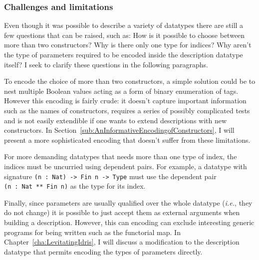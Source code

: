 \documentclass{ituthesis}
\newcommand{\tttype}[1]{\textcolor{type-color}{\texttt{#1}}}
\newcommand{\ttvar}[1]{\textcolor{local-var-color}{\texttt{#1}}}
\begin{document}
\subsubsection{Challenges and limitations}
Even though it was possible to describe a variety of datatypes there are still a few questions that can be raised, such as: How is it possible to choose between more than two constructors? Why is there only one type for indices?
Why aren't the type of parameters required to be encoded inside the description datatype itself? I seek to clarify these questions in the following paragraphs.

To encode the choice of more than two constructors, a simple solution could be to nest multiple Boolean values acting as a form of binary enumeration of tags.
However this encoding is fairly crude: it doesn't capture important information such as the names of constructors, requires a series of possibly complicated tests and is not easily extendible if one wants to extend descriptions
with new constructors. In Section~\ref{sub:AnInformativeEncodingofConstructors}, I will present a more sophisticated encoding that doesn't suffer from these limitations.

For more demanding datatypes that needs more than one type of index, the indices must be uncurried using dependent pairs.
For example, a datatype with signature \texttt{(}\ttvar{n}~\texttt{:}~\tttype{Nat}\texttt{)~->~}\tttype{Fin}~\ttvar{n}~\texttt{->}~\tttype{Type} must use the dependent pair \tttype{(}\ttvar{n}~\texttt{:}~\tttype{Nat}~\tttype{**}~\tttype{Fin}~\ttvar{n}\tttype{)} as the type for its index.

Finally, since parameters are usually qualified over the whole datatype (\textit{i.e.}, they do not change) it is possible to just accept them as external arguments when building
a description. However, this can encoding can exclude interesting generic programs for being written such as the functorial map. In Chapter~\ref{cha:LevitatingIdris}, I will discuss a modification to the description datatype that permits encoding the types of
parameters directly.
\end{document}
